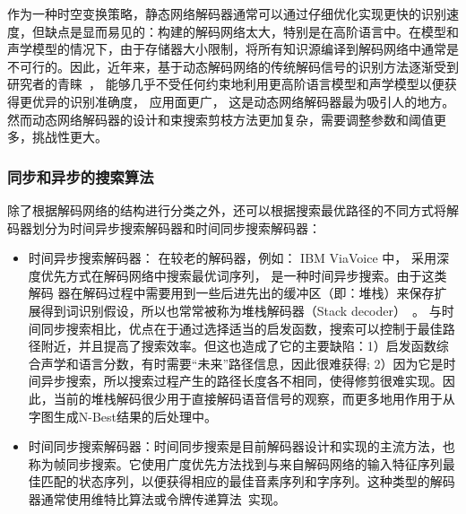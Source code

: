 作为一种时空变换策略，静态网络解码器通常可以通过仔细优化实现更快的识别速度，但缺点是显而易见的：构建的解码网络太大，特别是在高阶语言中。在模型和声学模型的情况下，由于存储器大小限制，将所有知识源编译到解码网络中通常是不可行的。因此，近年来，基于动态解码网络的传统解码信号的识别方法逐渐受到研究者的青睐~\cite{soltau2009dynamic,rybach2011comparative}， 能够几乎不受任何约束地利用更高阶语言模型和声学模型以便获得更优异的识别准确度， 应用面更广， 这是动态网络解码器最为吸引人的地方。然而动态网络解码器的设计和束搜索剪枝方法更加复杂，需要调整参数和阈值更多，挑战性更大。 

\subsubsection{同步和异步的搜索算法}
\label{chap:intro-lvcsr-decmethod-search}

除了根据解码网络的结构进行分类之外，还可以根据搜索最优路径的不同方式将解码器划分为时间异步搜索解码器和时间同步搜索解码器：

\begin{itemize}
\item 时间异步搜索解码器： 在较老的解码器，例如： IBM ViaVoice 中， 采用深度优先方式在解码网络中搜索最优词序列， 是一种时间异步搜索。由于这类解码
器在解码过程中需要用到一些后进先出的缓冲区（即：堆栈）来保存扩展得到词识别假设，所以也常常被称为堆栈解码器（Stack decoder）~\cite{paul1992efficient}。 
与时间同步搜索相比，优点在于通过选择适当的启发函数，搜索可以控制于最佳路径附近，并且提高了搜索效率。但这也造成了它的主要缺陷：1）启发函数综合声学和语言分数，有时需要“未来”路径信息，因此很难获得; 2）因为它是时间异步搜索，所以搜索过程产生的路径长度各不相同，使得修剪很难实现。因此，当前的堆栈解码很少用于直接解码语音信号的观察，而更多地用作用于从字图生成N-Best结果的后处理中。
\item 时间同步搜索解码器：时间同步搜索是目前解码器设计和实现的主流方法，也称为帧同步搜索。它使用广度优先方法找到与来自解码网络的输入特征序列最佳匹配的状态序列，以便获得相应的最佳音素序列和字序列。这种类型的解码器通常使用维特比算法或令牌传递算法~\cite{woodland1994large}实现。 
\end{itemize}

